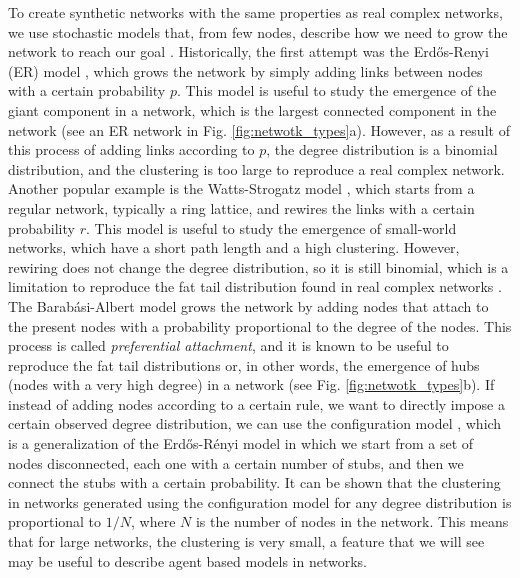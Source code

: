 To create synthetic networks with the same properties as real complex networks, we use stochastic models that, from few nodes, describe how we need to grow the network to reach our goal \cite{posfai2016network}. Historically, the first attempt was the Erd\H{o}s-Renyi (ER) model \cite{erdos1960evolution}, which grows the network by simply adding links between nodes with a certain probability $p$. This model is useful to study the emergence of the giant component in a network, which is the largest connected component in the network (see an ER network in Fig. \ref{fig:netwotk_types}a). However, as a result of this process of adding links according to $p$, the degree distribution is a binomial distribution, and the clustering is too large to reproduce a real complex network. Another popular example is the Watts-Strogatz model \cite{watts1998collective}, which starts from a regular network, typically a ring lattice, and rewires the links with a certain probability $r$. This model is useful to study the emergence of small-world networks, which have a short path length and a high clustering. However, rewiring does not change the degree distribution, so it is still binomial, which is a limitation to reproduce the fat tail distribution found in real complex networks \cite{newman2003structure}. The Barab\'asi-Albert model \cite{barabasi1999emergence} grows the network by adding nodes that attach to the present nodes with a probability proportional to the degree of the nodes. This process is called \textit{preferential attachment}, and it is known to be useful to reproduce the fat tail distributions \cite{merton1968matthew} or, in other words, the emergence of hubs (nodes with a very high degree) in a network (see Fig. \ref{fig:netwotk_types}b). If instead of adding nodes according to a certain rule, we want to directly impose a certain observed degree distribution, we can use the configuration model \cite{newman-book}, which is a generalization of the Erd\H{o}s-R\'enyi model in which we start from a set of nodes disconnected, each one with a certain number of stubs, and then we connect the stubs with a certain probability. It can be shown that the clustering in networks generated using the configuration model for any degree distribution is proportional to $1/N$, where $N$ is the number of nodes in the network. This means that for large networks, the clustering is very small, a feature that we will see may be useful to describe agent based models in networks.

